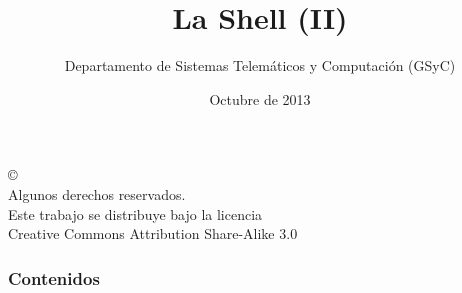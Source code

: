 \documentclass[ucs]{beamer}
\begin{document}
\title[La Shell (II)]{La Shell (II)}
\author[GSyC]{Departamento de Sistemas Telemáticos y Computación (GSyC)}
\date[2013]{Octubre de 2013}


\begin{frame}
  \titlepage
\end{frame}



\begin{frame}[b]
\begin{flushright}
{\tiny
\copyright \insertshortdate~\insertshortauthor \\
  Algunos derechos reservados. \\
  Este trabajo se distribuye bajo la licencia \\
  Creative Commons Attribution Share-Alike 3.0\\
}
\end{flushright}  
\end{frame}



\begin{frame}
  \frametitle{Contenidos}
  \tableofcontents
\end{frame}


\end{document}

